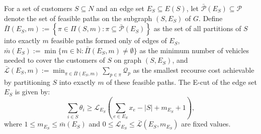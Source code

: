 \documentclass{article}
\begin{document}
For a set of customers $S \subseteq N$ and an edge set $E_S \subseteq E(S)$, let $\bar{\mathcal{P}}(E_S) \subseteq \mathcal{P}$ denote the set of feasible paths on the subgraph $(S,E_S)$ of $G$. Define $\bar{\Pi}(E_S,m) := \left\{ \pi \in \Pi(S,m) : \pi \subseteq \bar{\mathcal{P}}(E_S) \right\}$ as the set of all partitions of $S$ into exactly $m$ feasible paths formed only of edges of $E_S$, $\bar{m}(E_S) := \min\{m \in \mathbb{N} : \bar{\Pi}(E_S,m) \neq \emptyset\}$ as the minimum number of vehicles needed to cover the customers of $S$ on graph $(S,E_S)$, and $\bar{\mathcal{L}}(E_S, m) := \min_{ \pi \in \bar{\Pi}(E_S,m)} \sum_{p \in \pi} \mathcal{Q}_{p}$ as the smallest recourse cost achievable by partitioning $S$ into exactly $m$ of these feasible paths. The E-cut of the edge set $E_S$ is given by:
\begin{equation}
    \sum_{i \in S} \theta_{i} \geq \mathcal{L}_{E_S}\left( \sum_{e \in E_S}x_{e} - |S| + m_{E_S} + 1 \right), \label{DL:e-cut}
\end{equation}
where $1 \leq m_{E_S} \leq \bar{m}(E_S)$ and $0 \leq \mathcal{L}_{E_S}\leq \bar{\mathcal{L}}(E_S, m_{E_S})$ are fixed values.
\end{document}
